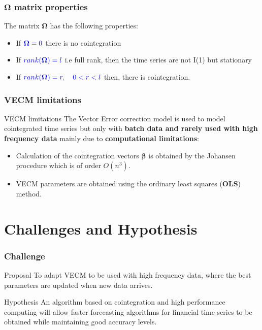 \documentclass{beamer}
\begin{document}
\begin{frame}
\frametitle{$\boldsymbol \Omega$ matrix properties}
The matrix $\boldsymbol \Omega$ has the following properties:
\begin{itemize}
\item If ${\color{blue}\boldsymbol \Omega = 0}$ there is no cointegration
\item If ${\color{blue}rank(\boldsymbol\Omega)=l}$ i.e full rank, then the time series are not
I(1) but stationary
\item If ${\color{blue}rank(\boldsymbol\Omega)=r,\quad 0 < r < l}$ then, there is cointegration.
\end{itemize}
\end{frame}


\begin{frame}
\frametitle{VECM limitations}

\begin{alertblock}{VECM limitations}
The Vector Error correction model is used to model cointegrated time series but only with {\bf batch data and rarely used with high frequency data} mainly due to {\bf computational limitations}:
\begin{itemize}
\item Calculation of the cointegration vectors $\boldsymbol \beta$ is obtained by the Johansen procedure which is of order $O(n^3)$.
\item VECM parameters are obtained using the ordinary least squares ({\bf OLS}) method.
\end{itemize}
\end{alertblock}
\end{frame}


\section{Challenges and Hypothesis}
\begin{frame}
\frametitle{Challenge}
\begin{block}{Proposal}
To adapt VECM to be used with high frequency data, where the best parameters are updated when new data arrives.
\end{block}
\begin{exampleblock}{Hypothesis}
An algorithm based on cointegration and high performance computing will allow faster forecasting
algorithms for financial time series to be obtained while maintaining good accuracy levels.
\end{exampleblock}
\end{frame}
\end{document}
